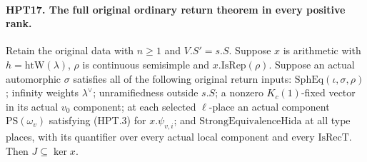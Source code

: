 \paragraph{HPT17. The full original ordinary return theorem in every positive rank.}
\label{claim:HPT17}
Retain the original data with $n\geq1$ and $V.S'=s.S$.
Suppose $x$ is arithmetic with $h=\mathrm{htW}(\lambda)$,
$\rho$ is continuous semisimple and $x.\mathrm{IsRep}(\rho)$.
Suppose an actual automorphic $\sigma$ satisfies all of the
following original return inputs: $\mathrm{SphEq}(\iota,\sigma,\rho)$;
infinity weights $\lambda^\vee$; unramifiedness outside $s.S$;
a nonzero $K_c(1)$-fixed vector in its actual $v_0$ component;
at each selected $\ell$-place an actual component
$\mathrm{PS}(\omega_v)$ satisfying (HPT.3) for $x.\psi_{v,i}$;
and $\mathrm{StrongEquivalenceHida}$ at all type places, with
its quantifier over every actual local component and every
$\mathrm{IsRecT}$.  Then $J\subseteq\ker x$.
